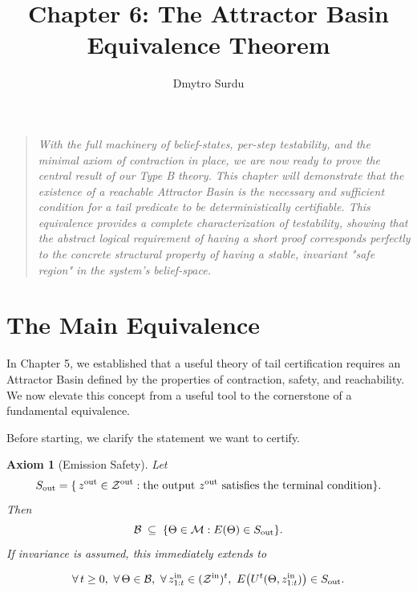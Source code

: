 \documentclass[12pt]{article}
\title{\textbf{Chapter 6: The Attractor Basin Equivalence Theorem}}
\author{Dmytro Surdu}
\date{}
\theoremstyle{definition}
\theoremstyle{plain}
\newtheorem{axiom}{Axiom}[section]
\begin{document}
\maketitle

\begin{quote}
\textit{With the full machinery of belief-states, per-step testability, and the minimal axiom of contraction in place, we are now ready to prove the central result of our Type B theory. This chapter will demonstrate that the existence of a reachable Attractor Basin is the necessary and sufficient condition for a tail predicate to be deterministically certifiable. This equivalence provides a complete characterization of testability, showing that the abstract logical requirement of having a short proof corresponds perfectly to the concrete structural property of having a stable, invariant "safe region" in the system's belief-space.}
\end{quote}

\section{The Main Equivalence}

In Chapter 5, we established that a useful theory of tail certification requires an Attractor Basin defined by the properties of contraction, safety, and reachability. We now elevate this concept from a useful tool to the cornerstone of a fundamental equivalence.

Before starting, we clarify the statement we want to certify.

\begin{axiom}[Emission Safety]
  Let 
  \[
    S_{\rm out}
    =\{\,z^{\text{out}}\in\mathcal Z^{\text{out}} : 
       \text{the output }z^{\text{out}}\text{ satisfies the terminal condition}\}.
  \]
  Then
  \[
    \mathcal B \;\subseteq\; 
      \{\Theta\in\mathcal M : E(\Theta)\in S_{\rm out}\}.
  \]
  If invariance is assumed, this immediately extends to

  \[\forall\,t\ge0,\ \forall\,\Theta\in\mathcal B,\ \forall\,z^{\text{in}}_{1:t}\in(\mathcal{Z}^{\text{in}})^t,\ 
    E\bigl(U^t(\Theta,z^{\text{in}}_{1:t})\bigr)\in S_{\rm out}.\]
    
\end{axiom}
\end{document}
